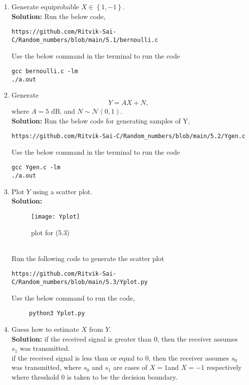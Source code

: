 \documentclass[journal,12pt,twocolumn]{IEEEtran}
\renewcommand\thesection{\arabic{section}}
\providecommand{\cbrak}[1]{\ensuremath{\left\{#1\right\}}}
\theoremstyle{remark}
\providecommand{\gauss}[2]{\mathcal{N}\ensuremath{\left(#1,#2\right)}}
\newcommand{\solution}{\noindent \textbf{Solution: }}
\numberwithin{equation}{section}
\begin{document}
\begin{enumerate}[label=\thesection.\arabic*
,ref=\thesection.\theenumi]
\item Generate equiprobable $X \in \cbrak{1,-1}$.\\
\solution
Run the below code,
\begin{lstlisting}
https://github.com/Ritvik-Sai-C/Random_numbers/blob/main/5.1/bernoulli.c
\end{lstlisting}
Use the below command in the terminal to run the code
\begin{lstlisting}
gcc bernoulli.c -lm
./a.out
\end{lstlisting}
\item Generate 
\begin{equation}
Y = AX+N,
\end{equation}
		where $A = 5$ dB,  and $N \sim \gauss{0}{1}$.\\
\solution
Run the below code for generating samples of Y,
\begin{lstlisting}
https://github.com/Ritvik-Sai-C/Random_numbers/blob/main/5.2/Ygen.c
\end{lstlisting}
Use the below command in the terminal to run the code
\begin{lstlisting}
gcc Ygen.c -lm
./a.out
\end{lstlisting}
\item Plot $Y$ using a scatter plot.\\
	\solution
	\begin{figure}[h]
\texttt{[image: Yplot]}
\caption{plot for (5.3)}
\label{fig:Y_Plot}
\end{figure}
\\
	Run the following code to generate the scatter plot
	\begin{lstlisting}
https://github.com/Ritvik-Sai-C/Random_numbers/blob/main/5.3/Yplot.py
	\end{lstlisting}
	Use the below command to run the code,
	\begin{lstlisting}
     python3 Yplot.py 
	\end{lstlisting}
\item Guess how to estimate $X$ from $Y$.\\
	\solution
	if the received signal is greater than 0, then the receiver assumes $s_1$ was transmitted.\\
if the received signal is less than or equal to 0, then the receiver assumes $s_0$ was transmitted, where $s_0$ and $s_1$ are cases of $X=1$and $X=-1$ respectively where threshold 0 is taken to be the decision boundary.

\end{enumerate}
\end{document}
